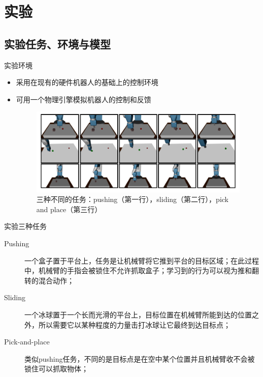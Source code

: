 \documentclass[10pt]{beamer}
\begin{document}
	\section{实验}
	
	\subsection{实验任务、环境与模型}
	
	\begin{frame}{实验}{环境}
		\begin{itemize}
			\item 采用在现有的硬件机器人的基础上的控制环境
			\item 可用一个物理引擎模拟机器人的控制和反馈
				\begin{figure}
					\centering
					\includegraphics[width=0.7\linewidth]{pictures/her-robot}
					\caption{三种不同的任务：pushing（第一行），sliding（第二行），pick and place（第三行）}
					\label{fig:her-robot}
				\end{figure}
				
		\end{itemize}
	\end{frame}

	\begin{frame}{实验}{三种任务}
		\begin{description}
			\item[Pushing] 一个盒子置于平台上，任务是让机械臂将它推到平台的目标区域；在此过程中，机械臂的手指会被锁住不允许抓取盒子；学习到的行为可以视为推和翻转的混合动作；
			
			\item[Sliding] 一个冰球置于一个长而光滑的平台上，目标位置在机械臂所能到达的位置之外，所以需要它以某种程度的力量击打冰球让它最终到达目标点；
			
			
			\item[Pick-and-place] 类似pushing任务，不同的是目标点是在空中某个位置并且机械臂收不会被锁住可以抓取物体；
			
		\end{description}
	\end{frame}
\end{document}
